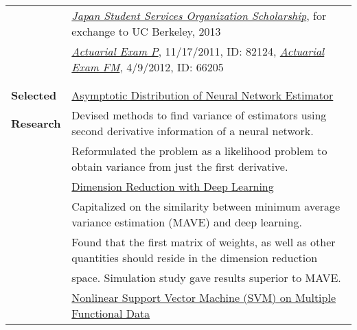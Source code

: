 \documentclass[utf8,letterpaper,oneside]{article}
\begin{document}
\begin{center}
\begin{tabular}{l l}
                           & \underline{{\textit{Japan Student Services Organization Scholarship}}}, for exchange to UC Berkeley, 2013                                        \\
                           & \underline{\textit{Actuarial Exam P}}, 11/17/2011, ID: 82124, \underline{\textit{Actuarial Exam FM}}, 4/9/2012, ID: 66205                        \\
                           &                                                                                                                                                  \\ \hline
                           &                                                                                                                                                  \\
  \textbf{Selected}        & \underline{Asymptotic Distribution of Neural Network Estimator}                                                                                  \\
  \textbf{Research}        & Devised methods to find variance of estimators using second derivative information of a neural network.                                          \\
                           & Reformulated the problem as a likelihood problem to obtain variance from just the first derivative.                                              \\
                           & \underline{Dimension Reduction with Deep Learning}                                                                                               \\
                           & Capitalized on the similarity between minimum average variance estimation (MAVE) and deep learning.                                              \\
                           & Found that the first matrix of weights, as well as other quantities should reside in the dimension reduction                                     \\
                           & space. Simulation study gave results superior to MAVE.                                                                                           \\
                           & \underline{Nonlinear Support Vector Machine (SVM) on Multiple Functional Data}                                                                   \\

\end{tabular}
\end{center}
\end{document}
